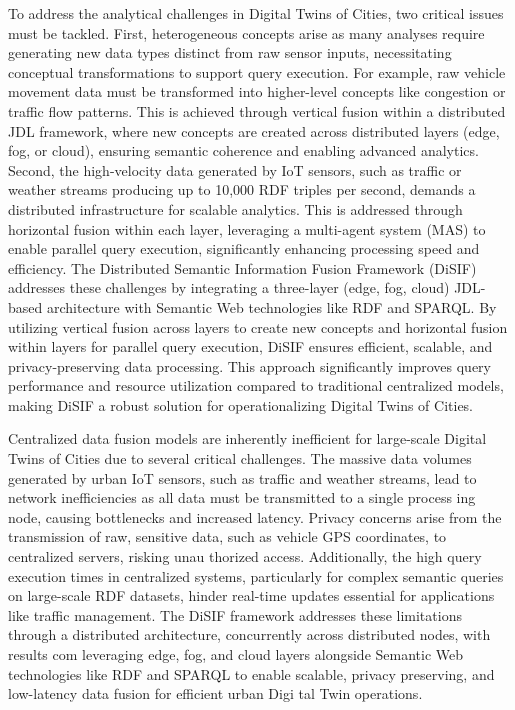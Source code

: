 \documentclass[5p,times]{elsarticle}
\begin{document}
 To address the analytical challenges in Digital Twins of Cities, two critical issues must be tackled.
 First, heterogeneous concepts arise as many analyses require generating new data types distinct from raw sensor inputs,
  necessitating conceptual transformations to support query execution. For example,
   raw vehicle movement data must be transformed into higher-level concepts
    like congestion or traffic flow patterns. This is achieved through vertical fusion within
     a distributed JDL framework, where new concepts are created across distributed layers 
     (edge, fog, or cloud), ensuring semantic coherence and enabling advanced analytics.
      Second, the high-velocity data generated by IoT sensors, such as traffic or weather
       streams producing up to 10,000 RDF triples per second, demands a distributed infrastructure
        for scalable analytics. This is addressed through horizontal fusion within each layer,
         leveraging a multi-agent system (MAS) to enable parallel query execution, significantly enhancing processing speed and efficiency.
The Distributed Semantic Information Fusion Framework (DiSIF) addresses these challenges by integrating a three-layer
 (edge, fog, cloud) JDL-based architecture with Semantic Web technologies like RDF and SPARQL. By utilizing vertical 
 fusion across layers to create new concepts and horizontal fusion within layers for parallel query execution,
  DiSIF ensures efficient, scalable, and privacy-preserving data processing. This approach significantly improves query
   performance and resource utilization compared to traditional centralized models, making DiSIF a robust solution for
    operationalizing Digital Twins of Cities.

    Centralized data fusion models are inherently inefficient
    for large-scale Digital Twins of Cities due to several critical
    challenges. The massive data volumes generated by urban IoT
    sensors, such as traffic and weather streams, lead to network
    inefficiencies as all data must be transmitted to a single process
   ing node, causing bottlenecks and increased latency. Privacy
    concerns arise from the transmission of raw, sensitive data, such
    as vehicle GPS coordinates, to centralized servers, risking unau
   thorized access. Additionally, the high query execution times in
    centralized systems, particularly for complex semantic queries
    on large-scale RDF datasets, hinder real-time updates essential
    for applications like traffic management. The DiSIF framework addresses these limitations through a distributed architecture,
    concurrently across distributed nodes, with results com
   leveraging edge, fog, and cloud layers alongside Semantic Web
    technologies like RDF and SPARQL to enable scalable, privacy
   preserving, and low-latency data fusion for efficient urban Digi
   tal Twin operations.
\end{document}
